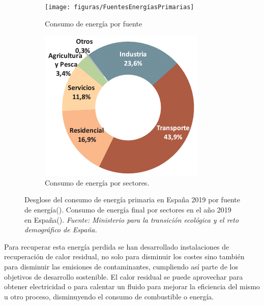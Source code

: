 \begin{figure}[H]
	\centering
	\begin{subfigure}[b]{0.48\textwidth}
		\texttt{[image: figuras/FuentesEnergíasPrimarias]}
		\caption{Consumo de energía por fuente}
		\label{fig:fuentesenergiasprimarias}
	\end{subfigure}
	\hfill
	\begin{subfigure}[b]{0.48\textwidth}
		\centering
		\includegraphics[width=\textwidth]{figuras/consumoEnergiaFinalPorSectores_2019}
		\caption{Consumo de energía por sectores.}
		\label{fig:consumoenergiafinalporsectores2019}
	\end{subfigure}
\caption[Desglose del consumo de energía primaria en España 20]{Desglose del consumo de energía primaria en España 2019 por fuente de energía(). Consumo de energía final por sectores en el año 2019 en España(). \textit{Fuente:  Ministerio para la transición ecológica y el reto demográfico de España.} }
 \label{fig:consumosEnergiasCategorias}
\end{figure}

Para recuperar esta energía perdida se han desarrollado instalaciones de recuperación de calor residual, no solo para disminuir los costes sino también para disminuir las emisiones de contaminantes, cumpliendo así parte de los objetivos de desarrollo sostenible. El calor residual se puede aprovechar para obtener electricidad o para calentar un fluido para mejorar la eficiencia del mismo u otro proceso, disminuyendo el consumo de combustible o energía.\\

